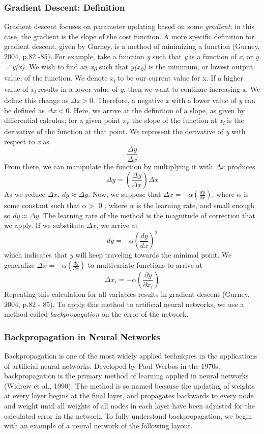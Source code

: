 \documentclass[11pt,titlepage]{article}
\begin{document}
\subsubsection{Gradient Descent: Definition}\label{sssec:GDD}
Gradient descent focuses on parameter updating based on some \textit{gradient}; in this case, the gradient is the slope of the cost function. A more specific definition for gradient descent, given by Gurney, is a method of minimizing a function (Gurney, 2004, p.82 -85). For example, take a function \textit{y} such that \textit{y} is a function of \textit{x}, or \textit{y} = \textit{y(x)}. We wish to find an \textit{x\textsubscript{0}} such that \textit{y(x\textsubscript{0})} is the minimum, or lowest output value, of the function. We denote \textit{x\textsubscript{i}} to be our current value for x. If a higher value of \textit{x\textsubscript{i}} results in a lower value of \textit{y}, then we want to continue increasing \textit{x}. We define this change as $\Delta$\textit{x}$>$0. Therefore, a negative \textit{x} with a lower value of \textit{y} can be defined as $\Delta$\textit{x}$<$0. Here, we arrive at the definition of a slope, as given by differential calculus; for a given point \textit{x\textsubscript{i}}, the slope of the function at \textit{x\textsubscript{i}} is the derivative of the function at that point. We represent the derivative of \textit{y} with respect to \textit{x} as $$\frac{\Delta y}{\Delta x}$$ From there, we can manipulate the function by multiplying it with $\Delta x$ produces $$\Delta y = (\frac{\Delta y}{\Delta x})\Delta x$$ As we reduce $\Delta x$, $dy \approx \Delta y$. Now, we suppose that $\Delta x = -\alpha(\frac{dy}{dx}) $, where $\alpha$ is some constant such that $\alpha > $ 0 , where $\alpha$ is the learning rate, and small enough so $dy \approx \Delta y$. The learning rate of the method is the magnitude of correction that we apply. If we substitute $\Delta x$, we arrive at $$ dy = -\alpha(\frac{dy}{dx})^{2}$$ which indicates that \textit{y} will keep traveling towards the minimal point. We generalize $\Delta x = -\alpha(\frac{dy}{dx}) $ to multivariate functions to arrive at $$\Delta x_i = -\alpha(\frac{\partial y}{\partial x_i})$$Repeating this calculation for all variables results in gradient descent (Gurney, 2004, p.82 - 85). To apply this method to artificial neural networks, we use a method called \textit{backpropagation} on the error of the network.

\subsubsection{Backpropagation in Neural Networks}
Backpropagation is one of the most widely applied techniques in the applications of artificial neural networks. Developed by Paul Werbos in the 1970s, backpropagation is the primary method of learning applied in neural networks (Widrow et al., 1990). The method is so named because the updating of weights at every layer begins at the final layer, and propagates backwards to every node and weight until all weights of all nodes in each layer have been adjusted for the calculated error in the network. To fully understand backpropagation, we begin with an example of a neural network of the following layout.
\end{document}
